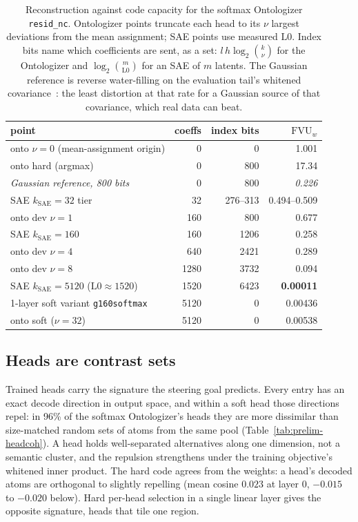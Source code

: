 \begin{table}[tp]\centering\small
\begin{tabular}{@{}lrrr@{}}
\toprule
point & coeffs & index bits & $\mathrm{FVU}_w$ \\
\midrule
onto $\nu{=}0$ (mean-assignment origin) & 0 & 0 & 1.001 \\
onto hard (argmax)                  & 0 & 800 & 17.34 \\
\emph{Gaussian reference, 800 bits} & 0 & 800 & \emph{0.226} \\
SAE $k_{\mathrm{SAE}}{=}32$ tier    & 32 & 276--313 & 0.494--0.509 \\
onto dev $\nu{=}1$                  & 160 & 800 & 0.677 \\
SAE $k_{\mathrm{SAE}}{=}160$        & 160 & 1206 & 0.258 \\
onto dev $\nu{=}4$                  & 640 & 2421 & 0.289 \\
onto dev $\nu{=}8$                  & 1280 & 3732 & 0.094 \\
SAE $k_{\mathrm{SAE}}{=}5120$ ($\mathrm{L0}{\approx}1520$) & 1520 & 6423 & \textbf{0.00011} \\
1-layer soft variant \texttt{g160softmax} & 5120 & 0 & 0.00436 \\
onto soft ($\nu{=}32$)              & 5120 & 0 & 0.00538 \\
\bottomrule
\end{tabular}
\caption{Reconstruction against code capacity for the softmax
Ontologizer \texttt{resid\_nc}. Ontologizer points truncate each head to
its $\nu$ largest deviations from the mean assignment; SAE points use
measured $\mathrm{L0}$. Index bits name which coefficients are sent, as a
set: $l\,h\log_2\binom{k}{\nu}$ for the Ontologizer and
$\log_2\binom{m}{\mathrm{L0}}$ for an SAE of $m$ latents. The Gaussian reference is reverse water-filling on the
evaluation tail's whitened covariance~\cite[Thm.~10.3.3]{cover2006}: the least
distortion at that rate for a Gaussian source of that covariance, which
real data can beat.}
\label{tab:prelim-pareto}
\end{table}

\subsection{Heads are contrast sets}
\label{sec:prelim-orth}
Trained heads carry the signature the steering goal predicts. Every
entry has an exact decode direction in output space, and within a soft
head those directions repel: in 96\% of the softmax Ontologizer's heads
they are more dissimilar than size-matched random sets of atoms from the
same pool (Table~\ref{tab:prelim-headcoh}). A head holds well-separated
alternatives along one dimension, not a semantic cluster, and the
repulsion strengthens under the training objective's whitened inner
product. The hard code agrees from the weights: a head's decoded atoms
are orthogonal to slightly repelling (mean cosine $0.023$ at layer 0,
$-0.015$ to $-0.020$ below). Hard per-head selection in a single linear
layer gives the opposite signature, heads that tile one region.

